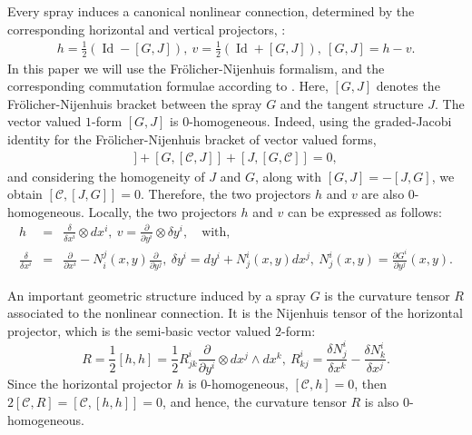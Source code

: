\documentclass[oneside,english]{amsart}
\theoremstyle{definition}
\theoremstyle{plain}
\theoremstyle{plain}
\theoremstyle{plain}
\theoremstyle{remark}
\theoremstyle{remark}
\theoremstyle{remark}
\begin{document}
Every spray induces a canonical nonlinear connection, determined by the corresponding horizontal and vertical projectors, \cite{Grifone72}:
\begin{eqnarray*}
h=\frac{1}{2}(\operatorname{Id}-[G,J]),\ v=\frac{1}{2}(\operatorname{Id}+[G,J]), \ [G,J]=h-v. \label{hv}
\end{eqnarray*}
In this paper we will use the Fr\"olicher-Nijenhuis formalism, and the corresponding commutation formulae according to \cite[Appendix A]{GM00}. Here, $[G,J]$ denotes the Fr\"olicher-Nijenhuis bracket between the spray $G$ and the tangent structure $J$. The vector valued $1$-form $[G,J]$ is $0$-homogeneous. Indeed, using the graded-Jacobi identity for the Fr\"olicher-Nijenhuis bracket of vector valued forms,
\begin{eqnarray*}
[\mathcal{C}, [J,G]]+[G,[\mathcal{C}, J]]+ [J, [G,\mathcal{C}]]=0,
\end{eqnarray*}
and considering the homogeneity of $J$ and $G$, along with $[G,J]=-[J,G]$, we obtain $[\mathcal{C}, [J,G]]=0$. Therefore, the two projectors $h$ and $v$ are also $0$-homogeneous. Locally, the two projectors $h$ and $v$ can be expressed as follows:
\begin{eqnarray}
h & = & \frac{\delta}{\delta x^i}\otimes dx^i,\ v=\frac{\partial}{\partial y^i}\otimes \delta y^i, \quad \textrm{with}, \nonumber \\
\frac{\delta}{\delta x^i} & = & \frac{\partial}{\partial x^i}-N_i^j(x,y)\frac{\partial}{\partial y^j},\ \delta y^i=dy^i+N_j^i(x,y)dx^j,\ N_j^i(x,y)=\frac{\partial G^i}{\partial y^j}(x,y). \label{delta}
\end{eqnarray}

An important geometric structure induced by a spray $G$ is the curvature tensor $R$ associated to the nonlinear connection. It is the Nijenhuis tensor of the horizontal projector, which is the semi-basic vector valued $2$-form:
\begin{equation}\label{r}
R=\frac{1}{2}[h,h]=\frac{1}{2} R_{jk}^i\dfrac{\partial }{\partial y^i}\otimes dx^j\wedge dx^k, \ R^i_{kj}=\frac{\delta N^i_j}{\delta x^k} - \frac{\delta N^i_k}{\delta x^j}. 
\end{equation}
Since the horizontal projector $h$ is $0$-homogeneous, $[\mathcal{C}, h]=0$, then $2[\mathcal{C},R]=[\mathcal{C}, [h,h]]=0$, and hence, the curvature tensor $R$ is also $0$-homogeneous.
\end{document}

